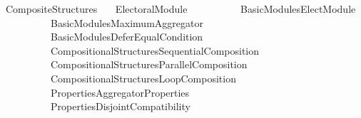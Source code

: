 %
\begin{isabellebody}%
%
%
\isadelimtheory
%
\endisadelimtheory
%
\isatagtheory
{}\isamarkupfalse%
\ Composite{\isacharunderscore}{\kern0pt}Structures\isanewline
\ \ \ {\isachardoublequoteopen}{\isachardot}{\kern0pt}{\isachardot}{\kern0pt}{\isacharslash}{\kern0pt}Electoral{\isacharunderscore}{\kern0pt}Module{\isachardoublequoteclose}\isanewline
\ \ \ \ \ \ \ \ \ \ {\isachardoublequoteopen}{\isachardot}{\kern0pt}{\isachardot}{\kern0pt}{\isacharslash}{\kern0pt}Basic{\isacharunderscore}{\kern0pt}Modules{\isacharslash}{\kern0pt}Elect{\isacharunderscore}{\kern0pt}Module{\isachardoublequoteclose}\isanewline
\ \ \ \ \ \ \ \ \ \ {\isachardoublequoteopen}{\isachardot}{\kern0pt}{\isachardot}{\kern0pt}{\isacharslash}{\kern0pt}Basic{\isacharunderscore}{\kern0pt}Modules{\isacharslash}{\kern0pt}Maximum{\isacharunderscore}{\kern0pt}Aggregator{\isachardoublequoteclose}\isanewline
\ \ \ \ \ \ \ \ \ \ {\isachardoublequoteopen}{\isachardot}{\kern0pt}{\isachardot}{\kern0pt}{\isacharslash}{\kern0pt}Basic{\isacharunderscore}{\kern0pt}Modules{\isacharslash}{\kern0pt}Defer{\isacharunderscore}{\kern0pt}Equal{\isacharunderscore}{\kern0pt}Condition{\isachardoublequoteclose}\isanewline
\ \ \ \ \ \ \ \ \ \ {\isachardoublequoteopen}{\isachardot}{\kern0pt}{\isachardot}{\kern0pt}{\isacharslash}{\kern0pt}Compositional{\isacharunderscore}{\kern0pt}Structures{\isacharslash}{\kern0pt}Sequential{\isacharunderscore}{\kern0pt}Composition{\isachardoublequoteclose}\isanewline
\ \ \ \ \ \ \ \ \ \ {\isachardoublequoteopen}{\isachardot}{\kern0pt}{\isachardot}{\kern0pt}{\isacharslash}{\kern0pt}Compositional{\isacharunderscore}{\kern0pt}Structures{\isacharslash}{\kern0pt}Parallel{\isacharunderscore}{\kern0pt}Composition{\isachardoublequoteclose}\isanewline
\ \ \ \ \ \ \ \ \ \ {\isachardoublequoteopen}{\isachardot}{\kern0pt}{\isachardot}{\kern0pt}{\isacharslash}{\kern0pt}Compositional{\isacharunderscore}{\kern0pt}Structures{\isacharslash}{\kern0pt}Loop{\isacharunderscore}{\kern0pt}Composition{\isachardoublequoteclose}\isanewline
\ \ \ \ \ \ \ \ \ \ {\isachardoublequoteopen}{\isachardot}{\kern0pt}{\isachardot}{\kern0pt}{\isacharslash}{\kern0pt}{\isachardot}{\kern0pt}{\isachardot}{\kern0pt}{\isacharslash}{\kern0pt}Properties{\isacharslash}{\kern0pt}Aggregator{\isacharunderscore}{\kern0pt}Properties{\isachardoublequoteclose}\isanewline
\ \ \ \ \ \ \ \ \ \ {\isachardoublequoteopen}{\isachardot}{\kern0pt}{\isachardot}{\kern0pt}{\isacharslash}{\kern0pt}{\isachardot}{\kern0pt}{\isachardot}{\kern0pt}{\isacharslash}{\kern0pt}Properties{\isacharslash}{\kern0pt}Disjoint{\isacharunderscore}{\kern0pt}Compatibility{\isachardoublequoteclose}\isanewline

\end{isabellebody}
